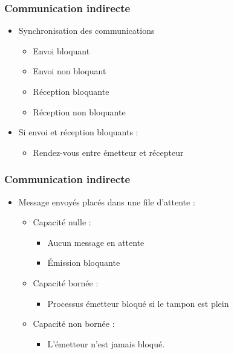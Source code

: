 \begin{frame}
\frametitle{Communication indirecte}
\begin{itemize}
\item Synchronisation des communications
\begin{itemize}
\item Envoi bloquant
\item Envoi non bloquant
\item Réception bloquante
\item Réception non bloquante
\end{itemize}
\item Si envoi et réception bloquants :
\begin{itemize}
\item Rendez-vous entre émetteur et récepteur
\end{itemize}
\end{itemize}
\end{frame}

\begin{frame}
\frametitle{Communication indirecte}
\begin{itemize}
\item Message envoyés placés dans une file d’attente :
\begin{itemize}
\item Capacité nulle :
\begin{itemize}
\item Aucun message en attente
\item Émission bloquante
\end{itemize}
\item Capacité bornée :
\begin{itemize}
\item Processus émetteur bloqué si le tampon est plein
\end{itemize}
\item Capacité non bornée :
\begin{itemize}
\item L’émetteur n’est jamais bloqué.
\end{itemize}
\end{itemize}
\end{itemize}
\end{frame}


